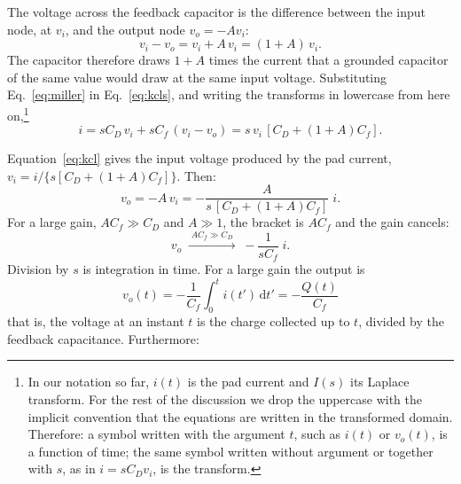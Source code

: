 \documentclass[11pt,a4paper]{article}
\newcommand{\dd}{\mathrm{d}}
\newcommand{\CD}{\ensuremath{C_D}}
\newcommand{\Cf}{\ensuremath{C_f}}
\begin{document}
The voltage across the feedback capacitor is the difference between the input node, at $v_i$, and the output node $v_o=-Av_i$:
%
\begin{equation}
 v_i - v_o = v_i + A\,v_i = (1+A)\,v_i .
\label{eq:miller}
\end{equation}
%
The capacitor therefore draws $1+A$ times the current that a grounded
capacitor of the same value would draw at the same input voltage.
Substituting Eq.~\eqref{eq:miller} in
Eq.~\eqref{eq:kcls}, and writing the transforms in lowercase from here
on,\footnote{In
our notation so far, $i(t)$ is the pad current and $I(s)$ its Laplace transform.
For the rest of the discussion we drop the uppercase with the implicit convention that 
the equations are written in the transformed domain.
Therefore: a symbol written with the
argument $t$, such as $i(t)$ or $v_o(t)$, is a function of time; the same
symbol written without argument or together with $s$, as in $i=s\CD v_i$, is
the transform.}
%
\begin{equation}
 i = s\CD\,v_i + s\Cf\,(v_i-v_o) = s\,v_i\,[\CD+(1+A)\Cf].
\label{eq:kcl}
\end{equation}
%

Equation~\eqref{eq:kcl} gives the input voltage produced by the pad
current, $v_i = i/\{s[\CD+(1+A)\Cf]\}$. Then:
%
\begin{equation}
 v_o = -A\,v_i = -\frac{A}{s\,[\CD+(1+A)\Cf]}\; i .
\label{eq:vofull}
\end{equation}
%
For a large gain, $A\Cf\gg\CD$ and $A\gg1$, the bracket is $A\Cf$ and the
gain cancels:
%
\begin{equation}
 v_o \;\xrightarrow{\;A\Cf\gg\CD\;}\; -\frac{1}{s\Cf}\; i .
\label{eq:vo}
\end{equation}
%
Division by $s$ is integration in time. For a large gain the output is
%
\begin{equation}
 \boxed{\;v_o(t) = -\frac{1}{\Cf}\int_0^t i(t')\,\dd t' = -\frac{Q(t)}{\Cf}\;}
\label{eq:qoverc}
\end{equation}
%
that is, the voltage at an instant $t$ is the charge collected up to $t$,
divided by the feedback capacitance. Furthermore:
\end{document}
